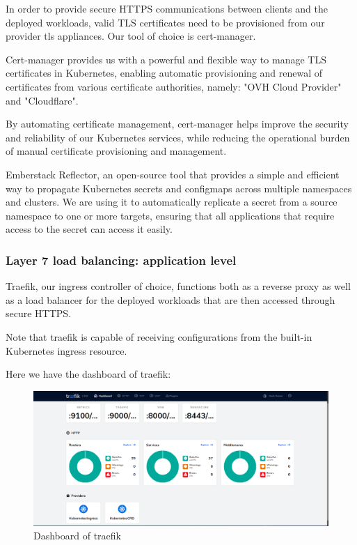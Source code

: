 
\hspace{7mm}In order to provide secure HTTPS communications between clients and the deployed workloads, valid TLS certificates need to be provisioned from our provider tls appliances. Our tool of choice is cert-manager.

\hspace{7mm}Cert-manager provides us with a powerful and flexible way to manage TLS certificates in Kubernetes, enabling automatic provisioning and renewal of certificates from various certificate authorities, namely: "OVH Cloud Provider" and "Cloudflare".

\hspace{7mm}By automating certificate management, cert-manager helps improve the security and reliability of our Kubernetes services, while reducing the operational burden of manual certificate provisioning and management.


\hspace{7mm}Emberstack Reflector, an open-source tool that provides a simple and efficient way to propagate Kubernetes secrets and configmaps across multiple namespaces and clusters. We are using it to automatically replicate a secret from a source namespace to one or more targets, ensuring that all applications that require access to the secret can access it easily.

\subsubsection{Layer 7 load balancing: application level }

\hspace{7mm}Traefik, our ingress controller of choice, functions both as a reverse proxy as well as a load balancer for the deployed workloads that are then accessed through secure HTTPS. 

\hspace{7mm}Note that traefik is capable of receiving configurations from the built-in Kubernetes ingress resource. 

\hspace{7mm}Here we have the dashboard of traefik: 

\begin{figure}[H]\centering
\includegraphics[width=1.0\textwidth,angle=00]{assets/f25.png}
\caption{ Dashboard of traefik }
\label{fig:dashboard of traefik}
\end{figure}

